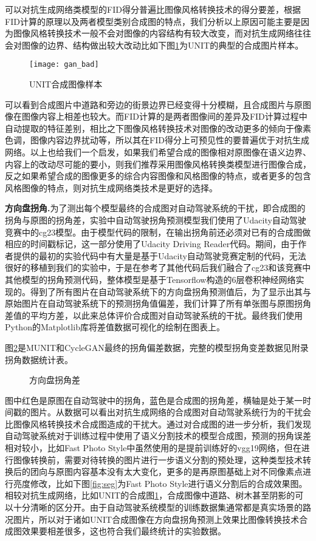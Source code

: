 可以对抗生成网络类模型的FID得分普遍比图像风格转换技术的得分要差，根据FID计算的原理以及两者模型类别合成图的特点，我们分析以上原因可能主要是因为图像风格转换技术一般不会对图像的内容结构有较大改变，而对抗生成网络往往会对图像的边界、结构做出较大改动比如下图\ref{fig:gan}为UNIT的典型的合成图片样本。
\begin{figure}[h]
    \centering
    \texttt{[image: gan\_bad]}
    \caption{UNIT合成图像样本}
    \label{fig:gan}
\end{figure}
可以看到合成图片中道路和旁边的街景边界已经变得十分模糊，且合成图片与原图像在图像内容上相差也较大。而FID计算的是两者图像间的差异及FID计算过程中自动提取的特征差别，相比之下图像风格转换技术对图像的改动更多的倾向于像素色调，图像内容边界扰动等，所以其在FID得分上可预见性的要普遍优于对抗生成网络。以上也给我们一个启发，如果我们希望合成的图像相对原图像在语义边界、内容上的改动尽可能的要小，则我们推荐采用图像风格转换类模型进行图像合成，反之如果希望合成的图像更多的综合内容图像和风格图像的特点，或者更多的包含风格图像的特点，则对抗生成网络类技术是更好的选择。 

 
\textbf{方向盘拐角.}\quad 为了测出每个模型最终的合成图对自动驾驶系统的干扰，即合成图的拐角与原图的拐角差，实验中自动驾驶拐角预测模型我们使用了Udacity自动驾驶竞赛中的cg23\cite{cg23}模型。由于模型代码的限制，在输出拐角前还必须对已有的合成图做相应的时间戳标记，这一部分使用了Udacity Driving Reader代码\cite{git:udr}。期间，由于作者提供的最初的实验代码中有大量是基于Udacity自动驾驶竞赛定制的代码，无法很好的移植到我们的实验中，于是在参考了其他代码后我们融合了cg23和该竞赛中其他模型的拐角预测代码，整体模型是基于Tensorflow构造的6层卷积神经网络实现的。得到了所有图片在自动驾驶系统下的方向盘拐角预测值后，为了显示出其与原始图片在自动驾驶系统下的预测拐角值偏差，我们计算了所有单张图与原图拐角差值的平均方差，以此来总体评价合成图对自动驾驶系统的干扰。最终我们使用Python的Matplotlib库将差值数据可视化的绘制在图表上。

图\ref{fig:sad}是MUNIT和CycleGAN最终的拐角偏差数据，完整的模型拐角变差数据见附录拐角数据统计表。
\begin{figure}[!h]
    \caption{方向盘拐角差}
    \label{fig:sad}
\end{figure}


图中红色是原图在自动驾驶中的拐角，蓝色是合成图的拐角差，横轴是处于某一时间戳的图片。从数据可以看出对抗生成网络的合成图对自动驾驶系统行为的干扰会比图像风格转换技术合成图造成的干扰大。通过对合成图的进一步分析，我们发现自动驾驶系统对于训练过程中使用了语义分割技术的模型合成图，预测的拐角误差相对较小，比如Fast Photo Style中虽然使用的是提前训练好的vgg19网络，但在进行图像转换前，需要对待转换的图片进行一步语义分割的预处理，这种类型技术转换后的团向与原图内容基本没有太大变化，更多的是再原图基础上对不同像素点进行亮度修改，比如下图\ref{fig:seg}为Fast Photo Style进行语义分割后的合成效果图。相较对抗生成网络，比如UNIT的合成图\ref{fig:gan}，合成图像中道路、树木甚至阴影的可以十分清晰的区分开。由于自动驾驶系统模型的训练数据集通常都是真实场景的路况图片，所以对于诸如UNIT合成图像在方向盘拐角预测上效果比图像转换技术合成图效果要相差很多，这也符合我们最终统计的实验数据。

